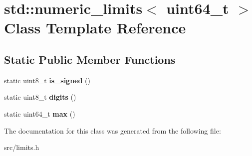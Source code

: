 \hypertarget{classstd_1_1numeric__limits_3_01uint64__t_01_4}{}\section{std\+:\+:numeric\+\_\+limits$<$ uint64\+\_\+t $>$ Class Template Reference}
\label{classstd_1_1numeric__limits_3_01uint64__t_01_4}
\subsection*{Static Public Member Functions}
\begin{DoxyCompactItemize}
\item 
\hypertarget{classstd_1_1numeric__limits_3_01uint64__t_01_4_abd529b27579bb255862d185aae752b66}{}\label{classstd_1_1numeric__limits_3_01uint64__t_01_4_abd529b27579bb255862d185aae752b66} 
static uint8\+\_\+t {\bfseries is\+\_\+signed} ()
\item 
\hypertarget{classstd_1_1numeric__limits_3_01uint64__t_01_4_a88acf52f05b3044df29bf5f518eadc9b}{}\label{classstd_1_1numeric__limits_3_01uint64__t_01_4_a88acf52f05b3044df29bf5f518eadc9b} 
static uint8\+\_\+t {\bfseries digits} ()
\item 
\hypertarget{classstd_1_1numeric__limits_3_01uint64__t_01_4_a2816ac1e866c55b9160dc6d83590f719}{}\label{classstd_1_1numeric__limits_3_01uint64__t_01_4_a2816ac1e866c55b9160dc6d83590f719} 
static uint64\+\_\+t {\bfseries max} ()
\end{DoxyCompactItemize}


The documentation for this class was generated from the following file\+:\begin{DoxyCompactItemize}
\item 
src/limits.\+h\end{DoxyCompactItemize}
